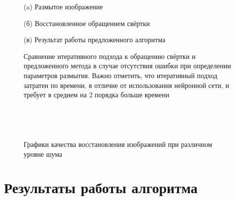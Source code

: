 \begin{figure}[H]
\begin{minipage}[t]{0.3\linewidth}
(a) Размытое изображение\\ 
\end{minipage}
\hfill
\begin{minipage}[t]{0.3\linewidth}
(б) Восстановленное обращением свёртки\\ 
\end{minipage}
\hfill
\begin{minipage}[t]{0.3\linewidth}
(в) Результат работы предложенного алгоритма\\ 
\end{minipage}
\caption{ Сравнение итеративного подхода к обращению свёртки и предложенного метода в случае отсутствия ошибки при определении параметров размытия. Важно отметить, что итеративный подход затратен по времени, в отличие от использования нейронной сети, и требует в среднем на 2 порядка больше времени}
\label{ris:restore_comparison}
\end{figure}

\begin{figure}[H]
\begin{minipage}[t]{0.46\linewidth}
\\ 
\end{minipage}
\hfill
\begin{minipage}[t]{0.46\linewidth}
\\
\end{minipage}
\caption{ Графики качества восстановления изображений при различном уровне шума }
\label{ris:plots_n}
\end{figure}

\newpage
\section{Результаты работы алгоритма}

